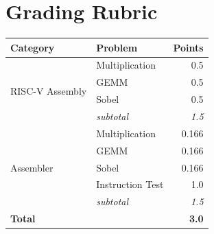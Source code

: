\documentclass[11pt]{article}
\begin{document}
\section{Grading Rubric}
\label{sec:rubric}
\begin{center}
\begin{tabular}{@{}llr@{}}
\toprule
\textbf{Category} & \textbf{Problem} & \textbf{Points} \\
\midrule
\multirow[t]{4}{*}{RISC-V Assembly}
  & Multiplication      & 0.5 \\
  & GEMM                & 0.5 \\
  & Sobel               & 0.5 \\
  & \textit{subtotal}   & \textit{1.5} \\
\midrule
\multirow[t]{5}{*}{Assembler}
  & Multiplication      & 0.166 \\
  & GEMM                & 0.166 \\
  & Sobel               & 0.166 \\
  & Instruction Test    & 1.0 \\
  & \textit{subtotal}   & \textit{1.5} \\
\midrule
\textbf{Total} & & \textbf{3.0} \\
\bottomrule
\end{tabular}
\end{center}


\end{document}
